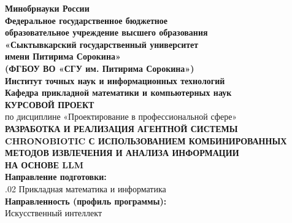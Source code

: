 \documentclass{syksu-coursework}
\begin{document}
\begin{titlepage}
    \begin{center}
        {\bfseries\fontsize{12pt}{14pt}\selectfont Минобрнауки России}\\
	
        {\bfseries\fontsize{12pt}{14pt}\selectfont Федеральное государственное бюджетное\\
        образовательное учреждение высшего образования\\
        «Сыктывкарский государственный университет\\
        имени Питирима Сорокина»\\
        (ФГБОУ ВО «СГУ им. Питирима Сорокина»)}\\
	
        {\bfseries\fontsize{12pt}{14pt}\selectfont Институт точных наук и информационных технологий}\\
        {\bfseries\fontsize{12pt}{14pt}\selectfont Кафедра прикладной математики и компьютерных наук}\\[1.5cm]

        {\textbf{КУРСОВОЙ ПРОЕКТ}}\\
	
        {\fontsize{12pt}{14pt}\selectfont по дисциплине «Проектирование в профессиональной сфере»}\\

        {\bfseries\fontsize{14pt}{18pt}\selectfont
        РАЗРАБОТКА И РЕАЛИЗАЦИЯ АГЕНТНОЙ СИСТЕМЫ\\
        CHRONOBIOTIC С ИСПОЛЬЗОВАНИЕМ КОМБИНИРОВАННЫХ\\
        МЕТОДОВ ИЗВЛЕЧЕНИЯ И АНАЛИЗА ИНФОРМАЦИИ\\
        НА ОСНОВЕ LLM}\\[1cm]

        {\bfseries\fontsize{12pt}{14pt}\selectfont Направление подготовки:}\\
        {\fontsize{12pt}{14pt}.02 Прикладная математика и информатика}\\

        {\bfseries\fontsize{12pt}{14pt}\selectfont Направленность (профиль программы):}\\
        {\fontsize{12pt}{14pt}\selectfont Искусственный интеллект}\\
    \end{center}


\end{titlepage}
\end{document}
